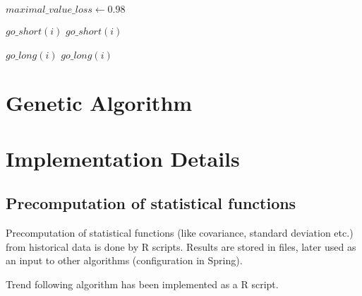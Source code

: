 \begin{algorithmic}

\STATE $maximal\_value\_loss \gets 0.98$



	    \STATE $go\_short(i)$
    \ELSE
		    \STATE $go\_short(i)$
	    \ENDIF
    \ENDIF

	    \STATE $go\_long(i)$
    \ELSE
		    \STATE $go\_long(i)$
	    \ENDIF
    \ENDIF

  \ENDFOR

\ENDFOR

\end{algorithmic}



\section{Genetic Algorithm}
\label{sec:genAlgoImpl}




\section{Implementation Details}
\label{sec:implDetails}

\subsection{Precomputation of statistical functions}
Precomputation of statistical functions (like covariance, standard deviation etc.) from historical data is done by R scripts. 
Results are stored in files, later used as an input to other algorithms (configuration in Spring).



Trend following algorithm has been implemented as a R script.







